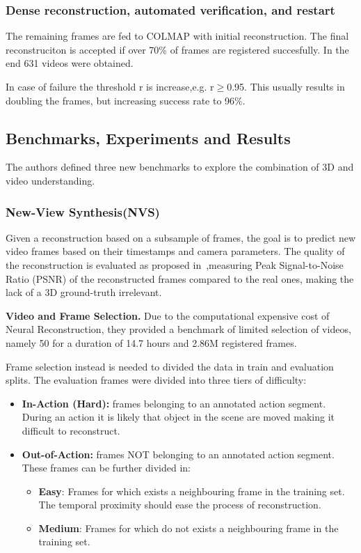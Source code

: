 \subsubsection{Dense reconstruction, automated verification, and restart}
The remaining frames are fed to COLMAP with initial reconstruction. The final reconstruciton is accepted if over 70\% of frames are registered succesfully.
In the end 631 videos were obtained.

In case of failure the threshold r is increase,e.g. r$\geq$0.95. This usually results in doubling the frames, but increasing success rate to 96\%.


\subsection{Benchmarks, Experiments and Results}
The authors defined three new benchmarks  to explore the combination of 3D and video understanding.

\subsubsection{New-View Synthesis(NVS)}
Given a reconstruction based on a subsample of frames, the goal is to predict new video frames based on their timestamps and camera parameters.
The quality of the reconstruction is evaluated as proposed in~\cite{nerf},measuring Peak Signal-to-Noise Ratio (PSNR) of the reconstructed frames
compared to the real ones, making the lack of a 3D ground-truth irrelevant.

\textbf{Video and Frame Selection.} Due to the computational expensive cost of Neural Reconstruction, they provided a benchmark of limited selection of 
videos, namely 50 for a duration of 14.7 hours and 2.86M registered frames.

Frame selection instead is needed to divided the data in train and evaluation splits. The evaluation frames were divided into three tiers of difficulty:
\begin{itemize}
    \item \textbf{In-Action (Hard):} frames belonging to an annotated action segment. During an action it is likely that object in the scene are moved making it difficult
        to reconstruct.
    \item  \textbf{Out-of-Action:} frames NOT belonging to an annotated action segment. These frames can be further divided in:
                \begin{itemize}
                    \item \textbf{Easy}: Frames for which exists a neighbouring frame in the training set. The temporal proximity should ease the process of reconstruction.
                    \item \textbf{Medium}: Frames for which do not exists a neighbouring frame in the training set. 
                \end{itemize}
\end{itemize}

